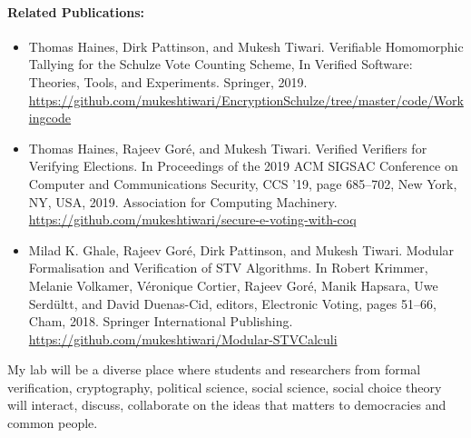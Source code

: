 \documentclass[a4paper]{article}
\begin{document}
\paragraph{Related Publications:}
\begin{itemize}
    \item {Thomas Haines, Dirk Pattinson, and Mukesh Tiwari.} 
    {Verifiable Homomorphic Tallying for the Schulze Vote Counting Scheme, 
    In Verified Software: Theories, Tools, and Experiments. Springer, 2019.}
    {\url{https://github.com/mukeshtiwari/EncryptionSchulze/tree/master/code/Workingcode}}
    \item  {Thomas Haines, Rajeev Gor{\'e}, and Mukesh Tiwari. 
    Verified Verifiers for Verifying Elections. In Proceedings of the 2019 ACM SIGSAC Conference on 
    Computer and Communications Security, CCS '19, page 685--702, New York, NY, 
    USA, 2019. Association for Computing Machinery.}
    {\url{https://github.com/mukeshtiwari/secure-e-voting-with-coq}}
    \item {Milad K. Ghale, Rajeev Gor{\'e}, Dirk Pattinson, and Mukesh Tiwari.
    Modular Formalisation and Verification of STV Algorithms. In Robert Krimmer, Melanie Volkamer, 
    V{\'e}ronique Cortier, 
    Rajeev Gor{\'e}, Manik Hapsara, Uwe Serd{\"u}ltt, and David Duenas-Cid, editors, 
    Electronic Voting, pages 51--66, Cham, 2018. Springer International Publishing.}
    {\url{https://github.com/mukeshtiwari/Modular-STVCalculi}}
\end{itemize}

My lab will be a diverse place where students and researchers from formal 
verification, cryptography, 
political science, social science, social choice theory will interact, discuss, 
collaborate on the ideas that matters to democracies and common people. 
\end{document}
